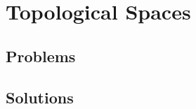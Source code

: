 \chapter{Topological Spaces}\label{chp:topological-spaces}

\section{Problems}



\section{Solutions}

